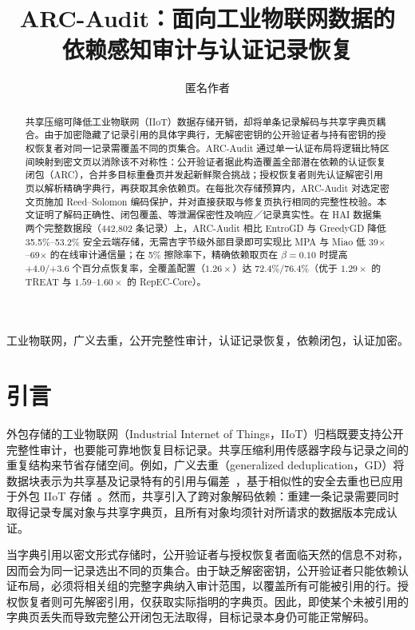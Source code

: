 \documentclass[10pt,journal]{IEEEtran}
\title{ARC-Audit：面向工业物联网数据的\\依赖感知审计与认证记录恢复}
\author{匿名作者}
\begin{document}
\maketitle
\begin{abstract}
共享压缩可降低工业物联网（IIoT）数据存储开销，却将单条记录解码与共享字典页耦合。由于加密隐藏了记录引用的具体字典行，无解密密钥的公开验证者与持有密钥的授权恢复者对同一记录需覆盖不同的页集合。ARC-Audit 通过单一认证布局将逻辑比特区间映射到密文页以消除该不对称性：公开验证者据此构造覆盖全部潜在依赖的认证恢复闭包（ARC），合并多目标重叠页并发起新鲜聚合挑战；授权恢复者则先认证解密引用页以解析精确字典行，再获取其余依赖页。在每批次存储预算内，ARC-Audit 对选定密文页施加 Reed--Solomon 编码保护，并对直接获取与修复页执行相同的完整性校验。本文证明了解码正确性、闭包覆盖、等泄漏保密性及响应／记录真实性。在 HAI 数据集两个完整数据段（442,802 条记录）上，ARC-Audit 相比 EntroGD 与 GreedyGD 降低 35.5\%--53.2\% 安全云端存储，无需吉字节级外部目录即可实现比 MPA 与 Miao 低 39$\times$--69$\times$ 的在线审计通信量；在 5\% 擦除率下，精确依赖取页在 $\beta{=}0.10$ 时提高 +4.0/+3.6 个百分点恢复率，全覆盖配置（$1.26\times$）达 72.4\%/76.4\%（优于 $1.29\times$ 的 TREAT 与 $1.59$--$1.60\times$ 的 RepEC-Core）。
\end{abstract}
\begin{IEEEkeywords}
工业物联网，广义去重，公开完整性审计，认证记录恢复，依赖闭包，认证加密。
\end{IEEEkeywords}

\section{引言}\label{sec:introduction}
外包存储的工业物联网（Industrial Internet of Things，IIoT）归档既要支持公开完整性审计，也要能可靠地恢复目标记录。共享压缩利用传感器字段与记录之间的重复结构来节省存储空间。例如，广义去重（generalized deduplication，GD）将数据块表示为共享基及记录特有的引用与偏差~\cite{Talasila2019}，基于相似性的安全去重也已应用于外包 IIoT 存储~\cite{Gao2024}。然而，共享引入了跨对象解码依赖：重建一条记录需要同时取得记录专属对象与共享字典页，且所有对象均须针对所请求的数据版本完成认证。

当字典引用以密文形式存储时，公开验证者与授权恢复者面临天然的信息不对称，因而会为同一记录选出不同的页集合。由于缺乏解密密钥，公开验证者只能依赖认证布局，必须将相关组的完整字典纳入审计范围，以覆盖所有可能被引用的行。授权恢复者则可先解密引用，仅获取实际指明的字典页。因此，即使某个未被引用的字典页丢失而导致完整公开闭包无法取得，目标记录本身仍可能正常解码。
\end{document}
